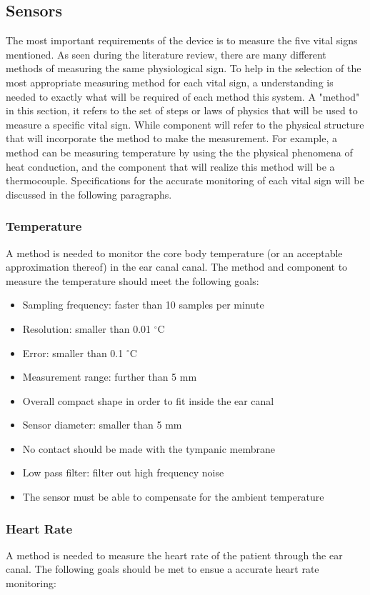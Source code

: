 \subsection{Sensors}
The most important requirements of the device is to measure the five vital signs mentioned. As seen during the literature review, there are many different methods of measuring the same physiological sign. To help in the selection of the most appropriate measuring method for each vital sign, a understanding is needed to exactly what will be required of each method this system. A "method" in this section, it refers to the set of steps or laws of physics that will be used to measure a specific vital sign. While component will refer to the physical structure that will incorporate the method to make the measurement. For example, a method can be measuring temperature by using the the physical phenomena of heat conduction, and the component that will realize this method will be a thermocouple. Specifications for the accurate monitoring of each vital sign will be discussed in the following paragraphs.

\subsubsection{Temperature}
A method is needed to monitor the core body temperature (or an acceptable approximation thereof) in the ear canal canal. The method and component to measure the temperature should meet the following goals:
\begin{itemize}
  \item Sampling frequency: faster than 10 samples per minute
  \item Resolution: smaller than 0.01 $^{\circ}$C
  \item Error: smaller than 0.1 $^{\circ}$C
  \item Measurement range: further than 5 mm
  \item Overall compact shape in order to fit inside the ear canal
  \item Sensor diameter: smaller than 5 mm
  \item No contact should be made with the tympanic membrane
  \item Low pass filter: filter out high frequency noise
  \item The sensor must be able to compensate for the ambient temperature
\end{itemize}

\subsubsection{Heart Rate}
A method is needed to measure the heart rate of the patient through the ear canal. The following goals should be met to ensue a accurate heart rate monitoring:

